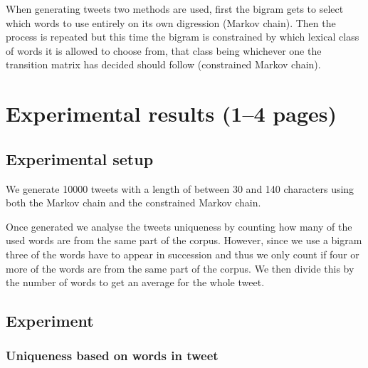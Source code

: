 \documentclass[a4paper,12pt]{article}
\begin{document}
When generating tweets two methods are used, first the bigram gets to select which words to use entirely on its own digression (Markov chain). Then the process is repeated but this time the bigram is constrained by which lexical class of words it is allowed to choose from, that class being whichever one the transition matrix has decided should follow (constrained Markov chain).

\section{Experimental results (1--4 pages)}
\label{sec:exps}

\subsection{Experimental setup}
We generate 10000 tweets with a length of between 30 and 140 characters using both the Markov chain and the constrained Markov chain.

Once generated we analyse the tweets uniqueness by counting how many of the used words are from the same part of the corpus. However, since we use a bigram three of the words have to appear in succession and thus we only count if four or more of the words are from the same part of the corpus. We then divide this by the number of words to get an average for the whole tweet.

\newpage
\subsection{Experiment}

\subsubsection{Uniqueness based on words in tweet}
\end{document}
